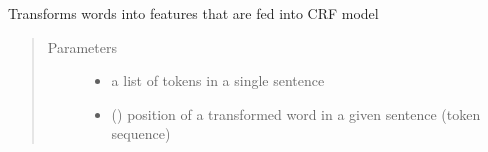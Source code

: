 \documentclass[letterpaper,10pt,english]{sphinxmanual}
\begin{document}
\begin{fulllineitems}
\begin{fulllineitems}
\label{\detokenize{contents:ner_plugins.NER_CRF.NER_CRF.word2features}}
Transforms words into features that are fed into CRF model
\begin{quote}\begin{description}
\item[{Parameters}] \leavevmode\begin{itemize}
\item {} 
 \textendash{} a list of tokens in a single sentence

\item {} 
 () \textendash{} position of a transformed word in a given sentence (token sequence)

\end{itemize}

\end{description}\end{quote}

\end{fulllineitems}


\end{fulllineitems}

\end{document}

